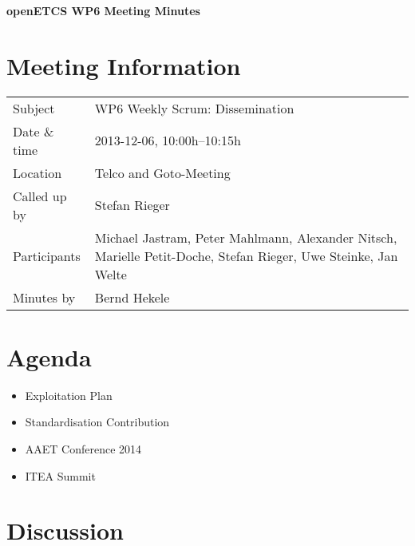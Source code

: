 \documentclass[a4paper, 11pt]{article}
\begin{document}
{\begin{center}\huge\bf openETCS WP6 Meeting Minutes\end{center}}
\section{Meeting Information}

\renewcommand{\arraystretch}{1.5}
\begin{supertabular}{m{.2\textwidth}m{.8\textwidth}}
Subject & WP6 Weekly Scrum: Dissemination\\
Date \& time & 2013-12-06, 10:00h--10:15h\\
Location & Telco and Goto-Meeting\\
Called up by & Stefan Rieger\\
Participants &
Michael Jastram,
Peter Mahlmann,
Alexander Nitsch,
Marielle Petit-Doche,
Stefan Rieger,
Uwe Steinke,
Jan Welte
\\

Minutes by & Bernd Hekele\\

\end{supertabular}
\renewcommand{\arraystretch}{1.0}


\section{Agenda}
\begin{itemize}

\item Exploitation Plan
\item Standardisation Contribution
\item AAET Conference 2014
\item ITEA Summit

\end{itemize}

\section{Discussion}
\end{document}
